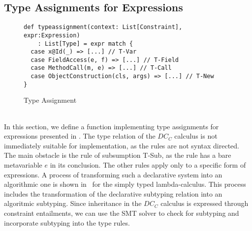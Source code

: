 \subsection{Type Assignments for Expressions}
\label{sec:typeass}
%
\begin{figure}[h]
\begin{lstlisting}
def typeassignment(context: List[Constraint], expr:Expression)
    : List[Type] = expr match {
  case x@Id(_) => [...] // T-Var
  case FieldAccess(e, f) => [...] // T-Field
  case MethodCall(m, e) => [...] // T-Call
  case ObjectConstruction(cls, args) => [...] // T-New
}
\end{lstlisting}
\caption{Type Assignment}
\label{fig:scala-typeass}
\end{figure}\quad\\
%
In this section, we define a function 
implementing type assignments for expressions presented in .
The type relation of the $DC_C$ calculus is not immediately suitable for implementation,
as the rules are not syntax directed.
The main obstacle is the rule of subsumption T-Sub,
as the rule has a bare metavariable $e$ in its conclusion.
The other rules apply only to a specific form of expressions.
A process of transforming such a declarative system into an algorithmic one
is shown in~\cite{tpl} for the simply typed lambda-calculus.
This process includes the transformation of the declarative subtyping relation
into an algoritmic subtyping.
Since inheritance in the $DC_C$ calculus is expressed through constraint entailments,
we can use the SMT solver to check for subtyping
and incorporate subtyping into the type rules.

